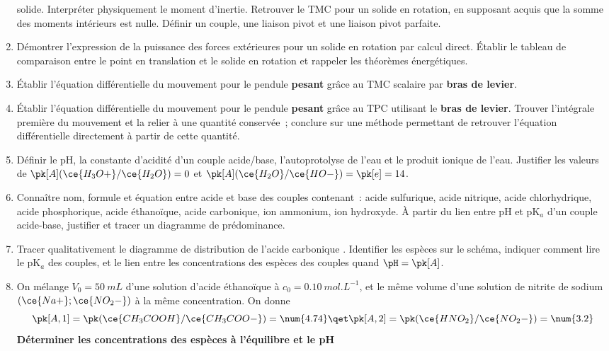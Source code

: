 \documentclass[a4paper, 12pt, final, garamond]{book}
\begin{document}
\begin{enumerate}[label=\sqenumi]
	      solide. Interpréter physiquement le moment d'inertie.
	      Retrouver le TMC pour un solide en rotation, en supposant acquis
	      que la somme des moments intérieurs est nulle. Définir un couple, une
	      liaison pivot et une liaison pivot parfaite.
	\item Démontrer l'expression de la puissance des forces extérieures pour un
	      solide en rotation par calcul direct. Établir le tableau de comparaison
	      entre le point en translation et le solide en rotation et rappeler les
	      théorèmes énergétiques.
	\item Établir l'équation différentielle du mouvement pour le pendule
	      \textbf{pesant} grâce au TMC scalaire par \textbf{bras de levier}.
	\item Établir l'équation différentielle du mouvement pour le pendule
	      \textbf{pesant} grâce au TPC utilisant le \textbf{bras de levier}.
	      Trouver l'intégrale première du mouvement et la relier à une quantité
	      conservée~; conclure sur une méthode permettant de retrouver l'équation
	      différentielle directement à partir de cette quantité.

	\item Définir le pH, la constante d'acidité d'un couple acide/base,
	      l'autoprotolyse de l'eau et le produit ionique de l'eau. Justifier les
	      valeurs de $\pk[A](\ce{H_3O+}/\ce{H_2O}) = 0$ et
	      $\pk[A](\ce{H_2O}/\ce{HO-}) = \pk[e] = 14$.
	\item Connaître nom, formule et équation entre acide et base des couples
	      contenant~: acide sulfurique, acide nitrique, acide chlorhydrique, acide
	      phosphorique, acide éthanoïque, acide carbonique, ion ammonium, ion
	      hydroxyde. À partir du lien entre pH et pK$_a$ d'un couple acide-base,
	      justifier et tracer un diagramme de prédominance.
	\item Tracer qualitativement le diagramme de distribution de l'acide
	      carbonique . Identifier les espèces sur le schéma, indiquer
	      comment lire le pK$_a$ des couples, et le lien entre les concentrations
	      des espèces des couples quand $\pH = \pk[A]$.
	\item
	      On mélange $V_0 = \SI{50}{mL}$ d'une solution d'acide éthanoïque à $c_0
		      = \SI{0.10}{mol.L^{-1}}$, et le même volume d'une solution de nitrite de
	      sodium $\left( \ce{Na+};\ce{NO_2-} \right)$ à la même concentration. On
	      donne
	      \[
		      \pk[A,1] = \pk(\ce{CH_3COOH}/\ce{CH_3COO-}) = \num{4.74}
		      \qet
		      \pk[A,2] = \pk(\ce{HNO_2}/\ce{NO_2-}) = \num{3.2}
	      \]
	      \textbf{Déterminer les concentrations des espèces à l'équilibre et le
		      pH}
\end{enumerate}
\end{document}
